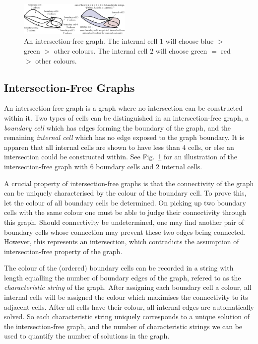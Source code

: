 \documentclass[conference]{IEEEtran}
\begin{document}
\begin{figure}[t]
\centering
\includegraphics[width=0.48\textwidth]{figures/characteristic_string}
\caption{An intersection-free graph. The internal cell $1$ will choose blue $>$ green $>$ other colours. The internal cell $2$ will choose green $=$ red $>$ other colours.}\label{fig:characteristic_string}
\end{figure}

\subsection{Intersection-Free Graphs}

An intersection-free graph is a graph where no intersection can be constructed within it. Two types of cells can be distinguished in an intersection-free graph, a \textit{boundary cell} which has edges forming the boundary of the graph, and the remaining \textit{internal cell} which has no edge exposed to the graph boundary. It is apparen that all internal cells are shown to have less than $4$ cells, or else an intersection could be constructed within. 
See Fig.~\ref{fig:characteristic_string} for an illustration of the intersection-free graph with $6$ boundary cells and $2$ internal cells. 

A crucial property of intersection-free graphs is that the connectivity of the graph can be uniquely characterised by the colour of the boundary cell. 
To prove this, let the colour of all boundary cells be determined. On picking up two boundary cells with the same colour one must be able to judge their connectivity through this graph. Should connectivity be undetermined, one may find another pair of boundary cells whose connection may prevent these two edges being connected. However, this represents an intersection, which contradicts the assumption of intersection-free property of the graph. 

The colour of the (ordered) boundary cells can be recorded in a string with length equalling the number of boundary edges of the graph, refered to as the \textit{characteristic string} of the graph. After assigning each boundary cell a colour, all internal cells will be assigned the colour which maximises the connectivity to its adjacent cells. 
After all cells have their colour, all internal edges are automatically solved. 
So each characteristic string uniquely corresponds to a unique solution of the intersection-free graph, and the number of characteristic strings we can be used to quantify the number of solutions in the graph. 
\end{document}
